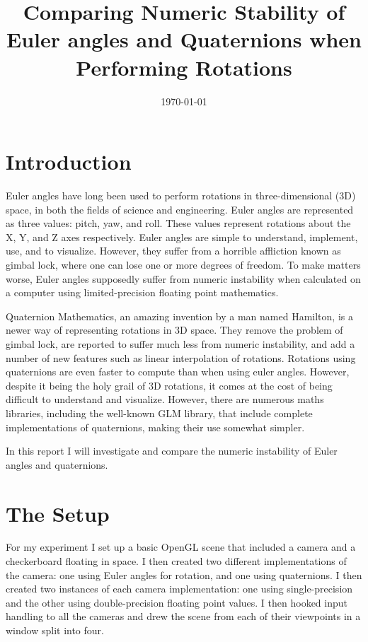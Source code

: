 \documentclass[a4paper]{article}
\title{Comparing Numeric Stability of Euler angles and Quaternions when Performing Rotations}
\author{}
\date{\today}
\begin{document}
\maketitle

\section{Introduction}

Euler angles have long been used to perform rotations in three-dimensional (3D) space, in both the fields of science and engineering. Euler angles are represented as three values: pitch, yaw, and roll. These values represent rotations about the X, Y, and Z axes respectively. Euler angles are simple to understand, implement, use, and to visualize. However, they suffer from a horrible affliction known as gimbal lock, where one can lose one or more degrees of freedom. To make matters worse, Euler angles supposedly suffer from numeric instability when calculated on a computer using limited-precision floating point mathematics.

Quaternion Mathematics, an amazing invention by a man named Hamilton, is a newer way of representing rotations in 3D space. They remove the problem of gimbal lock, are reported to suffer much less from numeric instability, and add a number of new features such as linear interpolation of rotations. Rotations using quaternions are even faster to compute than when using euler angles. However, despite it being the holy grail of 3D rotations, it comes at the cost of being difficult to understand and visualize. However, there are numerous maths libraries, including the well-known GLM library, that include complete implementations of quaternions, making their use somewhat simpler.

In this report I will investigate and compare the numeric instability of Euler angles and quaternions.

\section{The Setup}

For my experiment I set up a basic OpenGL scene that included a camera and a checkerboard floating in space. I then created two different implementations of the camera: one using Euler angles for rotation, and one using quaternions. I then created two instances of each camera implementation: one using single-precision and the other using double-precision floating point values. I then hooked input handling to all the cameras and drew the scene from each of their viewpoints in a window split into four.
\end{document}
